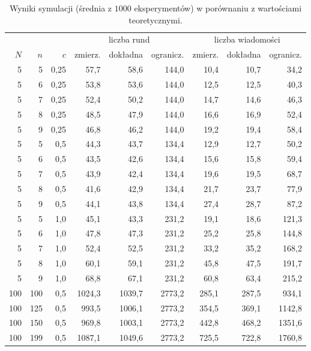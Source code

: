 \documentclass[11pt,a4paper]{article}
\begin{document}
\begin{table}[htbp]
    \centering
    \small
    \renewcommand{\arraystretch}{1.15}
    \begin{tabular}{rrr|rrr|rrr}
        \hline
        & & & \multicolumn{3}{c|}{liczba rund} & \multicolumn{3}{c}{liczba wiadomości} \\
        $N$ & $n$ & $c$ & zmierz. & dokładna & ogranicz. & zmierz. & dokładna & ogranicz. \\
        \hline
5 & 5 & 0{,}25 & 57{,}7 & 58{,}6 & 144{,}0 & 10{,}4 & 10{,}7 & 34{,}2 \\
5 & 6 & 0{,}25 & 53{,}8 & 53{,}6 & 144{,}0 & 12{,}5 & 12{,}5 & 40{,}3 \\
5 & 7 & 0{,}25 & 52{,}4 & 50{,}2 & 144{,}0 & 14{,}7 & 14{,}6 & 46{,}3 \\
5 & 8 & 0{,}25 & 48{,}5 & 47{,}9 & 144{,}0 & 16{,}6 & 16{,}9 & 52{,}4 \\
5 & 9 & 0{,}25 & 46{,}8 & 46{,}2 & 144{,}0 & 19{,}2 & 19{,}4 & 58{,}4 \\
\hline
5 & 5 & 0{,}5 & 44{,}3 & 43{,}7 & 134{,}4 & 12{,}9 & 12{,}7 & 50{,}2 \\
5 & 6 & 0{,}5 & 43{,}5 & 42{,}6 & 134{,}4 & 15{,}6 & 15{,}8 & 59{,}4 \\
5 & 7 & 0{,}5 & 43{,}9 & 42{,}4 & 134{,}4 & 19{,}6 & 19{,}5 & 68{,}7 \\
5 & 8 & 0{,}5 & 41{,}6 & 42{,}9 & 134{,}4 & 21{,}7 & 23{,}7 & 77{,}9 \\
5 & 9 & 0{,}5 & 44{,}1 & 43{,}8 & 134{,}4 & 27{,}4 & 28{,}7 & 87{,}2 \\
\hline
5 & 5 & 1{,}0 & 45{,}1 & 43{,}3 & 231{,}2 & 19{,}1 & 18{,}6 & 121{,}3 \\
5 & 6 & 1{,}0 & 47{,}8 & 47{,}3 & 231{,}2 & 25{,}2 & 25{,}8 & 144{,}8 \\
5 & 7 & 1{,}0 & 52{,}4 & 52{,}5 & 231{,}2 & 33{,}2 & 35{,}2 & 168{,}2 \\
5 & 8 & 1{,}0 & 60{,}1 & 59{,}1 & 231{,}2 & 45{,}8 & 47{,}5 & 191{,}7 \\
5 & 9 & 1{,}0 & 68{,}8 & 67{,}1 & 231{,}2 & 60{,}8 & 63{,}4 & 215{,}2 \\
\hline
100 & 100 & 0{,}5 & 1024{,}3 & 1039{,}7 & 2773{,}2 & 285{,}1 & 287{,}5 & 934{,}1 \\
100 & 125 & 0{,}5 & 993{,}5 & 1006{,}1 & 2773{,}2 & 354{,}5 & 369{,}1 & 1142{,}8 \\
100 & 150 & 0{,}5 & 969{,}8 & 1003{,}1 & 2773{,}2 & 442{,}8 & 468{,}2 & 1351{,}6 \\
100 & 199 & 0{,}5 & 1087{,}1 & 1049{,}6 & 2773{,}2 & 725{,}5 & 722{,}8 & 1760{,}8 \\
\hline
    \end{tabular}
    \caption{Wyniki symulacji (średnia z $1000$ eksperymentów) w porównaniu z wartościami teoretycznymi.}
    \label{tab:sym}
\end{table}
\end{document}
